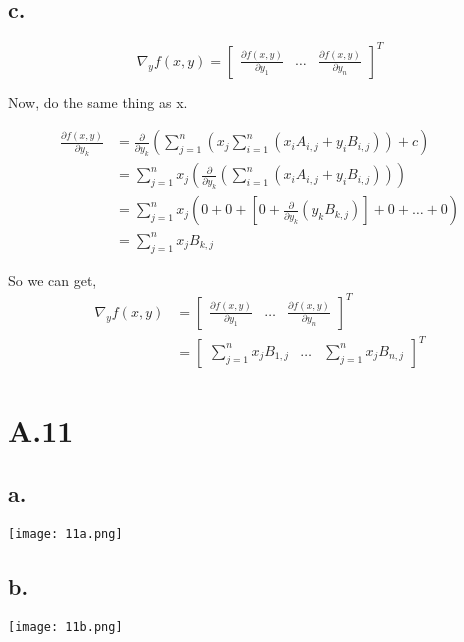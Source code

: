 \documentclass{article}
\begin{document}
\subsection{c.}
\[
\nabla_y f(x,y)=
\begin{bmatrix}
\frac{\partial f(x,y)}{\partial y_1} &
\dots &
\frac{\partial f(x,y)}{\partial y_n}
\end{bmatrix}^T
\]

Now, do the same thing as x. \newline

\begin{equation}
\begin{split}
\frac{\partial f(x,y)}{\partial y_k} & = \frac{\partial}{\partial y_k}(\sum_{j=1}^n (x_j \sum_{i=1}^n (x_i A_{i,j}+ y_i B_{i,j}))+c) \\
& = \sum_{j=1}^n x_j(\frac{\partial}{\partial y_k}(\sum_{i=1}^n (x_i A_{i,j}+ y_i B_{i,j}))) \\
& = \sum_{j=1}^n x_j (0+0+[0+\frac{\partial}{\partial y_k}(y_k B_{k,j})]+0+\dots + 0)\\
& = \sum_{j=1}^n x_j B_{k,j}
\end{split}
\end{equation}

So we can get, 
\begin{equation}
\begin{split}
\nabla_y f(x,y) & = \begin{bmatrix}
\frac{\partial f(x,y)}{\partial y_1} &
\dots &
\frac{\partial f(x,y)}{\partial y_n}
\end{bmatrix}^T \\
& = \begin{bmatrix}
\sum_{j=1}^n x_j B_{1,j} &
\dots &
\sum_{j=1}^n x_j B_{n,j}
\end{bmatrix}^T
\end{split}
\end{equation}




\section{A.11}
\subsection{a.}
\texttt{[image: 11a.png]}

\subsection{b.}
\texttt{[image: 11b.png]}
\end{document}
